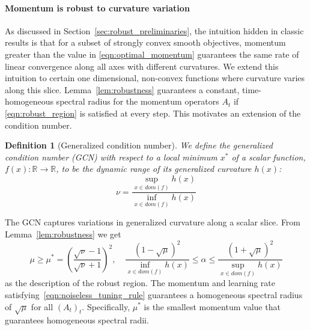 \documentclass{article} %
\newtheorem{definition}[theorem]{Definition}
\newcommand{\mat}[1]{\bm{\mathit{#1}}}
\begin{document}
\vspace{-0.5em}
\paragraph{Momentum is robust to curvature variation}
\label{sec:curvature_robustness}

As discussed in Section~\ref{sec:robust_preliminaries}, the intuition hidden in classic results
is that for a subset of strongly convex smooth objectives, momentum greater than the value in \eqref{eqn:optimal_momentum} guarantees the same rate of linear convergence along all axes with different curvatures. 
We extend this intuition to certain one dimensional, non-convex functions where curvature varies along this slice.
Lemma~\ref{lem:robustness} guarantees a constant, time-homogeneous spectral radius for the momentum operators $\mat{A}_t$ if 
\eqref{eqn:robust_region} is satisfied at every step. 
This motivates an extension of the condition number.
\begin{definition}[Generalized condition number]
We define the generalized condition number (GCN) with respect to a local minimum $x^*$ of a scalar function, $f(x):\mathbb{R}\rightarrow \mathbb{R}$, to be the dynamic range of its generalized curvature $h(x)$:
\begin{equation}
	\nu = \frac{\sup_{x \in dom(f)} h(x)}{ \inf_{x \in dom(f)} h(x)}
\end{equation}
\end{definition}
The GCN captures variations in generalized curvature along a scalar slice.
From Lemma~\ref{lem:robustness} we get
\begin{equation}
	\mu \geq \mu^* = \left(\frac{\sqrt{\nu}-1}{\sqrt{\nu}+1}\right)^2,
	\quad
	\frac{(1-\sqrt{\mu})^2}{\inf_{x \in dom(f)}h(x)} \leq \alpha \leq \frac{(1+\sqrt{\mu})^2}{\sup_{x \in dom(f)}h(x)}
	\label{eqn:noiseless_tuning_rule}
\end{equation}
as the description of the robust region. The momentum and learning rate satisfying~\eqref{eqn:noiseless_tuning_rule} guarantees a homogeneous spectral radius of $\sqrt{\mu}$ for all $(\mat{A}_t)_t$.
Specifically, $\mu^*$ is the smallest momentum value that guarantees homogeneous spectral radii.
\end{document}
